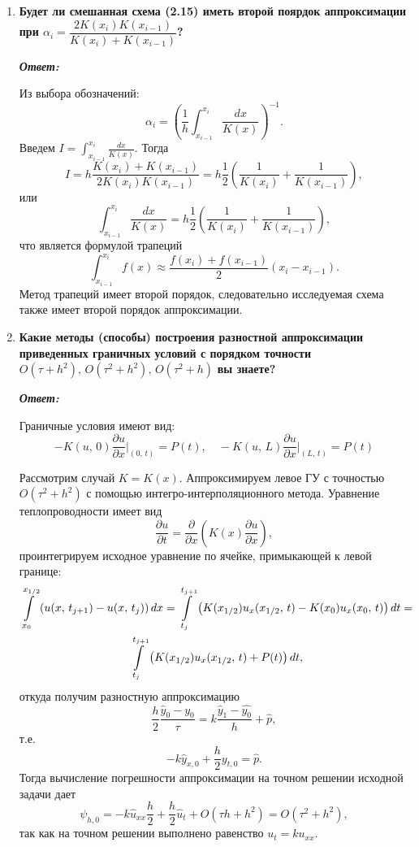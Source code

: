 \documentclass[12pt, a4paper]{article}
\newcommand{\prt}[2]{\frac{\partial#1}{\partial #2}}
\begin{document}
\begin{enumerate}
		\item \textbf{Будет ли смешанная схема (2.15) иметь второй поярдок аппроксимации при $\alpha_i = \dfrac{2K(x_i)K(x_{i-1})}{K(x_i) + K(x_{i-1})}$?}
		\vspace*{0.2cm}
		
		\textit{\textbf{Ответ:}}
		
		Из выбора обозначений:
		\[
		\alpha_i = \left( \frac 1 h \int_{x_{i-1}}^{x_i} \frac{dx}{K(x)} \right)^{-1}.
		\]
		Введем $I = \int_{x_{i-1}}^{x_i} \frac{dx}{K(x)}$. Тогда
		\[
		I = h \dfrac{K(x_i) + K(x_{i-1})}{2K(x_i)K(x_{i-1})} = h \frac 1 2 \left( \frac{1}{K(x_i)} + \frac{1}{K(x_{i-1})} \right),
		\]
		или
		\[
		\int_{x_{i-1}}^{x_i} \frac{dx}{K(x)} = h \frac 1 2 \left( \frac{1}{K(x_i)} + \frac{1}{K(x_{i-1})} \right),
		\]
		что является формулой трапеций
		\[
		\int_{x_{i-1}}^{x_i} f(x) \approx \frac{f(x_i) + f(x_{i-1})}{2} \left( x_i - x_{i-1} \right).
		\]
		Метод трапеций имеет второй порядок, следовательно исследуемая схема также имеет второй порядок аппроксимации.
		\item \textbf{Какие методы (способы) построения разностной аппроксимации приведенных граничных условий с порядком точности} $O(\tau + h^2), \, O(\tau^2 + h^2), \, O(\tau^2 + h)$ \textbf{вы знаете?}
		\vspace*{0.2cm}
		
		\textit{\textbf{Ответ:}}
		
		Граничные условия имеют вид:
		\[
		-K(u, \, 0) \prt{u}{x} \Bigg|_{(0, \, t)} = P(t), \quad -K(u, \, L) \prt{u}{x} \Bigg|_{(L, \, t)} = P(t)
		\]
		
		Рассмотрим случай $K = K(x)$. Аппроксимируем левое ГУ с точностью $O(\tau^2 + h^2)$ с помощью интегро-интерполяционного метода. Уравнение теплопроводности имеет вид
		\[
		\prt{u}{t} = \prt{}{x}\left( K(x) \prt{u}{x} \right),
		\]
		проинтегрируем исходное уравнение по ячейке, примыкающей к левой границе:
		\begin{multline*}
			\int\displaylimits_{x_0}^{x_{1/2}} \left( u(x, \, t_{j+1}) - u(x, \, t_{j}) \right) dx = \int\displaylimits_{t_j}^{t_{j+1}} \left( K(x_{1/2}) u_x(x_{1/2}, \, t) - K(x_0) u_x(x_0, \, t) \right) dt=\\
			\int\displaylimits_{t_j}^{t_{j+1}} \left( K(x_{1/2}) u_x(x_{1/2}, \, t) + P(t) \right) dt,
		\end{multline*}
		откуда получим разностную аппроксимацию
		\[
		\frac h 2 \frac{\hat{y}_0 - y_0}{\tau} = k \frac{\hat{y}_1 - \hat{y_0}}{h} + \hat{p},
		\]
		т.е.
		\[
		-k \hat{y}_{x,0} +\frac h 2 y_{t,0} = \hat{p}.
		\]
		Тогда вычисление погрешности аппроксимации на точном решении исходной задачи дает
		\[
		\psi_{h,0} = -k\hat{u}_{xx} \frac h 2 + \frac h 2 \hat{u}_t + O(\tau h + h^2) = O(\tau^2 + h^2),
		\]
		так как на точном решении выполнено равенство $u_t = ku_{xx}$.
		

\end{enumerate}
\end{document}
